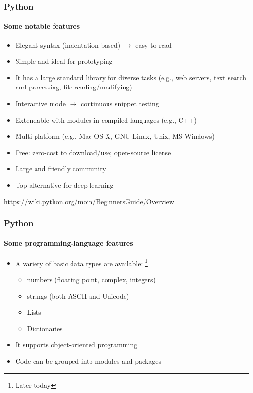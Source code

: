 \documentclass[xcolor=x11names,handout]{beamer}
\newcommand{\light}[1]{\textcolor{gray}{#1}}
\begin{document}
\begin{frame}
\frametitle{Python}
\framesubtitle{Some notable features}

\begin{itemize}
\item Elegant syntax (indentation-based) $\rightarrow$ easy to read	\pause
\item Simple and ideal for prototyping	\pause
\item It has a large standard library for diverse tasks (e.g., web servers,
text search and processing, file reading/modifying)	\pause
\item Interactive mode $\rightarrow$ continuous snippet testing	\pause
\item Extendable with modules in compiled languages (e.g., C++)	\pause
\item Multi-platform (e.g., Mac OS X, GNU Linux, Unix, MS Windows)	\pause
\item Free: zero-cost to download/use; open-source license	\pause
\item Large and friendly community		\pause
\item Top alternative for deep learning
\end{itemize}
\bigskip

\onslide
\light{\url{https://wiki.python.org/moin/BeginnersGuide/Overview}}
\end{frame}

\begin{frame}
\frametitle{Python}
\framesubtitle{Some programming-language features}

\begin{itemize}
\item A variety of basic data types are available:%
\footnote{Later today}
\begin{itemize}
 \item numbers (floating point, complex, integers)
 \item strings (both ASCII and Unicode)
 \item Lists
 \item Dictionaries
\end{itemize}		\bigskip	\pause

\item It supports object-oriented programming	\bigskip

\item Code can be grouped into modules and packages
\end{itemize}
\end{frame}
\end{document}
